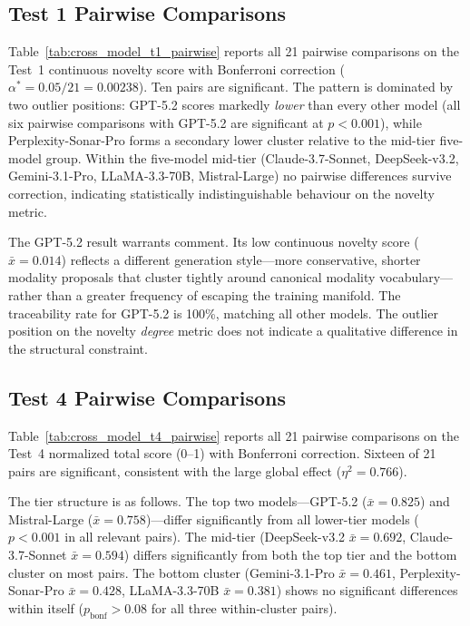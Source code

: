\subsection{Test 1 Pairwise Comparisons}
\label{sec:cross_model_t1_pairwise}

Table~\ref{tab:cross_model_t1_pairwise} reports all 21 pairwise comparisons on the Test~1 continuous novelty score with Bonferroni correction ($\alpha^* = 0.05/21 = 0.00238$). Ten pairs are significant. The pattern is dominated by two outlier positions: GPT-5.2 scores markedly \emph{lower} than every other model (all six pairwise comparisons with GPT-5.2 are significant at $p<0.001$), while Perplexity-Sonar-Pro forms a secondary lower cluster relative to the mid-tier five-model group. Within the five-model mid-tier (Claude-3.7-Sonnet, DeepSeek-v3.2, Gemini-3.1-Pro, LLaMA-3.3-70B, Mistral-Large) no pairwise differences survive correction, indicating statistically indistinguishable behaviour on the novelty metric.

The GPT-5.2 result warrants comment. Its low continuous novelty score ($\bar{x}=0.014$) reflects a different generation style---more conservative, shorter modality proposals that cluster tightly around canonical modality vocabulary---rather than a greater frequency of escaping the training manifold. The traceability rate for GPT-5.2 is 100\%, matching all other models. The outlier position on the novelty \emph{degree} metric does not indicate a qualitative difference in the structural constraint.



\subsection{Test 4 Pairwise Comparisons}
\label{sec:cross_model_t4_pairwise}

Table~\ref{tab:cross_model_t4_pairwise} reports all 21 pairwise comparisons on the Test~4 normalized total score (0--1) with Bonferroni correction. Sixteen of 21 pairs are significant, consistent with the large global effect ($\eta^2=0.766$).

The tier structure is as follows. The top two models---GPT-5.2 ($\bar{x}=0.825$) and Mistral-Large ($\bar{x}=0.758$)---differ significantly from all lower-tier models ($p<0.001$ in all relevant pairs). The mid-tier (DeepSeek-v3.2 $\bar{x}=0.692$, Claude-3.7-Sonnet $\bar{x}=0.594$) differs significantly from both the top tier and the bottom cluster on most pairs. The bottom cluster (Gemini-3.1-Pro $\bar{x}=0.461$, Perplexity-Sonar-Pro $\bar{x}=0.428$, LLaMA-3.3-70B $\bar{x}=0.381$) shows no significant differences within itself ($p_{\mathrm{bonf}}>0.08$ for all three within-cluster pairs).

